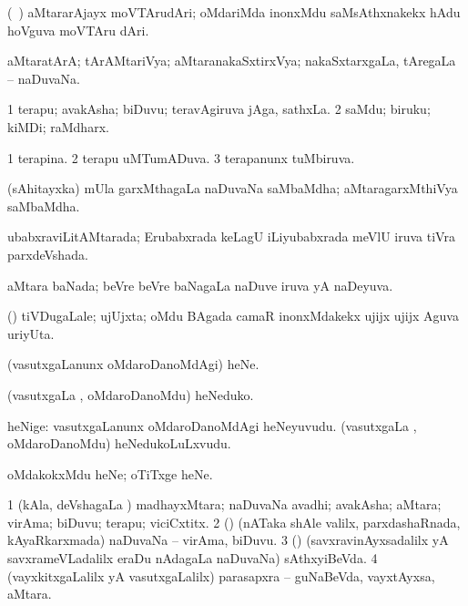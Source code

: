 \bentry
{}
\gl{\nA}
\bmng
(\kanmu\ \ame) aMtararAjayx moVTArudAri; oMdariMda inonxMdu saMsAthxnakekx hAdu hoVguva moVTAru dAri. 
\emng
\eentry

\bentry
{}
\gl{\gu}
\bmng
aMtaratArA; tArAMtariVya; aMtaranakaSxtirxVya; nakaSxtarxgaLa, tAregaLa -- naDuvaNa. 
\emng
\eentry

\bentry
{}
\gl{\nA}
\bmng
\bnum
\num{1} terapu; avakAsha; biDuvu; teravAgiruva jAga, sathxLa. 
\num{2} saMdu; biruku; kiMDi; raMdharx. 
\enum
\emng
\eentry

\bentry
{}
\gl{\gu}
\bmng
\bnum
\num{1} terapina. 
\num{2} terapu uMTumADuva. 
\num{3} terapanunx tuMbiruva. 
\enum
\emng
\eentry

\bentry
{}
\gl{\nA}
\bmng
(sAhitayxka) mUla garxMthagaLa naDuvaNa saMbaMdha; aMtaragarxMthiVya saMbaMdha. 
\emng
\eentry

\bentry
{}
\gl{\gu}
\bmng
ubabxraviLitAMtarada; Erubabxrada keLagU iLiyubabxrada meVlU iruva tiVra parxdeVshada. 
\emng
\eentry

\bentry
{}
\gl{\gu}
\bmng
aMtara baNada; beVre beVre baNagaLa naDuve iruva yA naDeyuva. 
\emng
\eentry

\bentry
{}
\gl{\nA}
\bmng
(\roVshA) tiVDugaLale; ujUjxta; oMdu BAgada camaR inonxMdakekx ujijx ujijx Aguva uriyUta. 
\emng
\eentry

\bentry
{}
\gl{\sakirx}
\bmng
(vasutxgaLanunx oMdaroDanoMdAgi) heNe. 
\emng

\noindent 
\gl{\akirx}
\bmng
(vasutxgaLa \vi, oMdaroDanoMdu) heNeduko. 
\emng
\eentry

\bentry
{}
\gl{\nA}
\bmng
heNige: 
\banum
{} vasutxgaLanunx oMdaroDanoMdAgi heNeyuvudu. 
 (vasutxgaLa \vi, oMdaroDanoMdu) heNedukoLuLxvudu. 
\eanum
\emng
\eentry

\bentry
{}
\gl{\sakirx}
\bmng
oMdakokxMdu heNe; oTiTxge heNe. 
\emng
\eentry

\bentry
{}
\gl{\nA}
\bmng
\bnum
\num{1} (kAla, deVshagaLa \vi) madhayxMtara; naDuvaNa avadhi; avakAsha; aMtara; virAma; biDuvu; terapu; viciCxtitx. 
\num{2} (\birx) (nATaka shAle \mo valilx, parxdashaRnada, kAyaRkarxmada) naDuvaNa -- virAma, biDuvu. 
\num{3} (\saM) (savxravinAyxsadalilx yA savxrameVLadalilx eraDu nAdagaLa naDuvaNa) sAthxyiBeVda. 
\num{4} (vayxkitxgaLalilx yA vasutxgaLalilx) parasapxra -- guNaBeVda, vayxtAyxsa, aMtara. 
\enum
\emng

